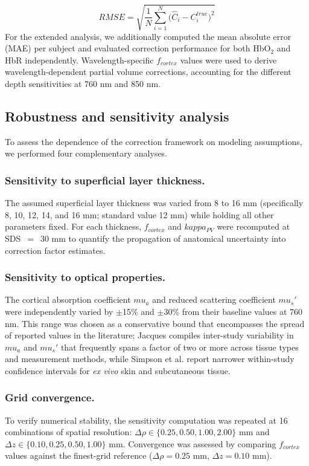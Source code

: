 \documentclass[11pt]{article}
\def\kappa{kappa}%
\def\mu{mu}%
\def\mathrm#1{#1}%
\def\,{ }%
\begin{document}
\begin{equation}
\mathrm{RMSE} = \sqrt{\frac{1}{N}\sum_{i=1}^{N}\bigl(\hat{C}_i - C_i^{\mathrm{true}}\bigr)^2}
\label{eq:rmse}
\end{equation}
For the extended analysis, we additionally computed the mean absolute error (MAE) per subject and evaluated correction performance for both HbO$_2$ and HbR independently. Wavelength-specific $f_{\mathrm{cortex}}$ values were used to derive wavelength-dependent partial volume corrections, accounting for the different depth sensitivities at 760\,nm and 850\,nm.

\subsection{Robustness and sensitivity analysis}
\label{sec:robustness}

To assess the dependence of the correction framework on modeling assumptions, we performed four complementary analyses.

\subsubsection{Sensitivity to superficial layer thickness.}
The assumed superficial layer thickness was varied from 8 to 16\,mm (specifically 8, 10, 12, 14, and 16\,mm; standard value 12\,mm) while holding all other parameters fixed. For each thickness, $f_{\mathrm{cortex}}$ and $\kappa_{\mathrm{PV}}$ were recomputed at SDS~$=$~30\,mm to quantify the propagation of anatomical uncertainty into correction factor estimates.

\subsubsection{Sensitivity to optical properties.}
The cortical absorption coefficient $\mu_a$ and reduced scattering coefficient $\mu_s'$ were independently varied by $\pm$15\% and $\pm$30\% from their baseline values at 760\,nm. This range was chosen as a conservative bound that encompasses the spread of reported values in the literature; Jacques\cite{r11} compiles inter-study variability in $\mu_a$ and $\mu_s'$ that frequently spans a factor of two or more across tissue types and measurement methods, while Simpson et al.\cite{r24} report narrower within-study confidence intervals for \textit{ex vivo} skin and subcutaneous tissue.

\subsubsection{Grid convergence.}
\label{sec:convergence}
To verify numerical stability, the sensitivity computation was repeated at 16 combinations of spatial resolution: $\Delta\rho \in \{0.25, 0.50, 1.00, 2.00\}$\,mm and $\Delta z \in \{0.10, 0.25, 0.50, 1.00\}$\,mm. Convergence was assessed by comparing $f_{\mathrm{cortex}}$ values against the finest-grid reference ($\Delta\rho = 0.25$\,mm, $\Delta z = 0.10$\,mm).
\end{document}
